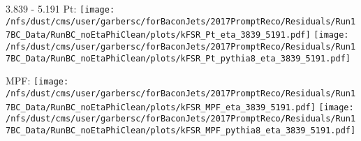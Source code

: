 \documentclass[t,compress]{beamer}
\begin{document}
\begin{frame}{3.839 - 5.191}
	 Pt: \texttt{[image: /nfs/dust/cms/user/garbersc/forBaconJets/2017PromptReco/Residuals/Run17BC\_Data/RunBC\_noEtaPhiClean/plots/kFSR\_Pt\_eta\_3839\_5191.pdf]}
	\texttt{[image: /nfs/dust/cms/user/garbersc/forBaconJets/2017PromptReco/Residuals/Run17BC\_Data/RunBC\_noEtaPhiClean/plots/kFSR\_Pt\_pythia8\_eta\_3839\_5191.pdf]}
\newline

	 MPF: \texttt{[image: /nfs/dust/cms/user/garbersc/forBaconJets/2017PromptReco/Residuals/Run17BC\_Data/RunBC\_noEtaPhiClean/plots/kFSR\_MPF\_eta\_3839\_5191.pdf]}
	\texttt{[image: /nfs/dust/cms/user/garbersc/forBaconJets/2017PromptReco/Residuals/Run17BC\_Data/RunBC\_noEtaPhiClean/plots/kFSR\_MPF\_pythia8\_eta\_3839\_5191.pdf]}
\end{frame}
\end{document}
